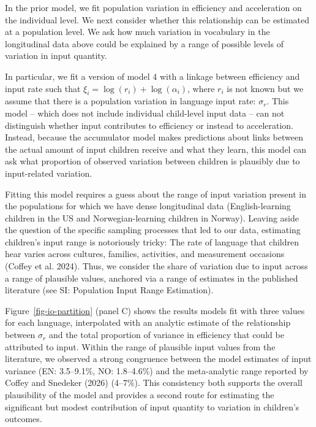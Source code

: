 \documentclass[
  11pt,
]{article}
\begin{document}
In the prior model, we fit population variation in efficiency and
acceleration on the individual level. We next consider whether this
relationship can be estimated at a population level. We ask how much
variation in vocabulary in the longitudinal data above could be
explained by a range of possible levels of variation in input quantity.

In particular, we fit a version of model 4 with a linkage between
efficiency and input rate such that
\(\xi_i = \log(r_i) + \log(\alpha_i)\), where \(r_i\) is not known but
we assume that there is a population variation in language input rate:
\(\sigma_r\). This model -- which does not include individual
child-level input data -- can not distinguish whether input contributes
to efficiency or instead to acceleration. Instead, because the
accumulator model makes predictions about links between the actual
amount of input children receive and what they learn, this model can ask
what proportion of observed variation between children is plausibly due
to input-related variation.

Fitting this model requires a guess about the range of input variation
present in the populations for which we have dense longitudinal data
(English-learning children in the US and Norwegian-learning children in
Norway). Leaving aside the question of the specific sampling processes
that led to our data, estimating children's input range is notoriously
tricky: The rate of language that children hear varies across cultures,
families, activities, and measurement occasions (Coffey et al. 2024).
Thus, we consider the share of variation due to input across a range of
plausible values, anchored via a range of estimates in the published
literature (see SI: Population Input Range Estimation).

Figure~\ref{fig-io-partition} (panel C) shows the results models fit
with three values for each language, interpolated with an analytic
estimate of the relationship between \(\sigma_r\) and the total
proportion of variance in efficiency that could be attributed to input.
Within the range of plausible input values from the literature, we
observed a strong congruence between the model estimates of input
variance (EN: 3.5--9.1\%, NO: 1.8--4.6\%) and the meta-analytic range
reported by Coffey and Snedeker (2026) (4--7\%). This consistency both
supports the overall plausibility of the model and provides a second
route for estimating the significant but modest contribution of input
quantity to variation in children's outcomes.
\end{document}
